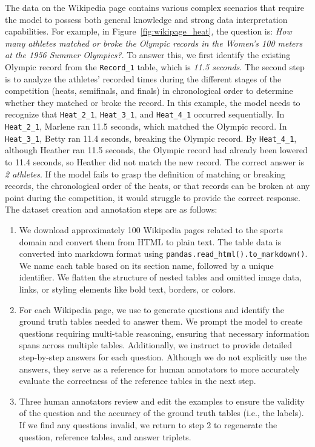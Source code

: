 The data on the Wikipedia page contains various complex scenarios that require the model to possess both general knowledge and strong data interpretation capabilities. For example, in Figure~\ref{fig:wikipage_heat}, the question is: \textit{How many athletes matched or broke the Olympic records in the Women's 100 meters at the 1956 Summer Olympics?}. To answer this, we first identify the existing Olympic record from the \texttt{Record\_1} table, which is \textit{11.5 seconds}. The second step is to analyze the athletes' recorded times during the different stages of the competition (heats, semifinals, and finals) in chronological order to determine whether they matched or broke the record. In this example, the model needs to recognize that \texttt{Heat\_2\_1}, \texttt{Heat\_3\_1}, and \texttt{Heat\_4\_1} occurred sequentially. In \texttt{Heat\_2\_1}, Marlene ran 11.5 seconds, which matched the Olympic record. In \texttt{Heat\_3\_1}, Betty ran 11.4 seconds, breaking the Olympic record. By \texttt{Heat\_4\_1}, although Heather ran 11.5 seconds, the Olympic record had already been lowered to 11.4 seconds, so Heather did not match the new record. The correct answer is \textit{2 athletes}. If the model fails to grasp the definition of matching or breaking records, the chronological order of the heats, or that records can be broken at any point during the competition, it would struggle to provide the correct response.
% 
The dataset creation and annotation steps are as follows:
\begin{enumerate}
    \item {} We download approximately 100 Wikipedia pages related to the sports domain and convert them from HTML to plain text. The table data is converted into markdown format using \texttt{pandas.read\_html().to\_markdown()}. We name each table based on its section name, followed by a unique identifier. We flatten the structure of nested tables and omitted image data, links, or styling elements like bold text, borders, or colors. 
    \item {} For each Wikipedia page, we use \claudetf to generate questions and identify the ground truth tables needed to answer them. We prompt the model to create questions requiring multi-table reasoning, ensuring that necessary information spans across multiple tables. Additionally, we instruct \claudetf to provide detailed step-by-step answers for each question. Although we do not explicitly use the answers, they serve as a reference for human annotators to more accurately evaluate the correctness of the reference tables in the next step. 
    \item {} Three human annotators review and edit the examples to ensure the validity of the question and the accuracy of the ground truth tables (i.e., the labels). If we find any questions invalid, we return to step 2 to regenerate the question, reference tables, and answer triplets.
\end{enumerate}

